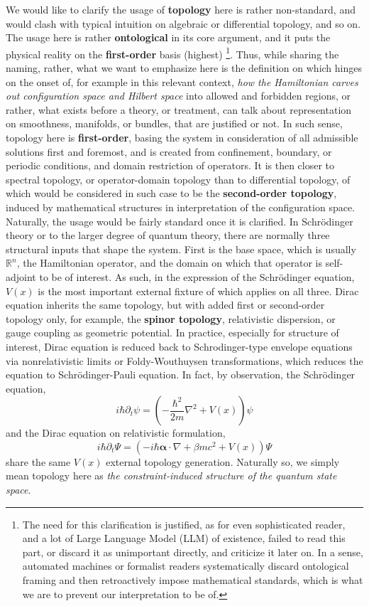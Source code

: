 \documentclass[%
 reprint,
 amsmath,amssymb,
 aps,
]{revtex4-2}
\begin{document}
We would like to clarify the usage of \textbf{topology} here is rather non-standard, and would clash with typical intuition on algebraic or differential topology, and so on. The usage here is rather \textbf{ontological} in its core argument, and it puts the physical reality on the \textbf{first-order} basis (highest) \footnote{The need for this clarification is justified, as for even sophisticated reader, and a lot of Large Language Model (LLM) of existence, failed to read this part, or discard it as unimportant directly, and criticize it later on. In a sense, automated machines or formalist readers systematically discard ontological framing and then retroactively impose mathematical standards, which is what we are to prevent our interpretation to be of.}. Thus, while sharing the naming, rather, what we want to emphasize here is the definition on which hinges on the onset of, for example in this relevant context, \textit{how the Hamiltonian carves out configuration space and Hilbert space} into allowed and forbidden regions, or rather, what exists before a theory, or treatment, can talk about representation on smoothness, manifolds, or bundles, that are justified or not. In such sense, topology here is \textbf{first-order}, basing the system in consideration of all admissible solutions first and foremost, and is created from confinement, boundary, or periodic conditions, and domain restriction of operators. It is then closer to spectral topology, or operator-domain topology than to differential topology, of which would be considered in such case to be the \textbf{second-order topology}, induced by mathematical structures in interpretation of the configuration space. Naturally, the usage would be fairly standard once it is clarified. In Schrödinger theory or to the larger degree of quantum theory, there are normally three structural inputs that shape the system. First is the base space, which is usually $\mathbb{R}^{n}$, the Hamiltonian operator, and the domain on which that operator is self-adjoint to be of interest. As such, in the expression of the Schrödinger equation, $V(x)$ is the most important external fixture of which applies on all three. Dirac equation inherits the same topology, but with added first or second-order topology only, for example, the \textbf{spinor topology}, relativistic dispersion, or gauge coupling as geometric potential. In practice, especially for structure of interest, Dirac equation is reduced back to Schrodinger-type envelope equations via nonrelativistic limits or Foldy-Wouthuysen transformations, which reduces the equation to Schrödinger-Pauli equation. In fact, by observation, the Schrödinger equation,
\begin{equation}
    i\hbar \partial_{t}\psi = \left(-\frac{\hbar^2}{2m}\nabla^{2}+V(x)\right)\psi
\end{equation}
and the Dirac equation on relativistic formulation,
\begin{equation}
    i\hbar \partial_t \Psi = (-i\hbar \bm{\alpha}\cdot \nabla + \beta mc^{2}+ V(x))\Psi
\end{equation}
share the same $V(x)$ external topology generation. Naturally so, we simply mean topology here as \textit{the constraint-induced structure of the quantum state space}. 
\end{document}

